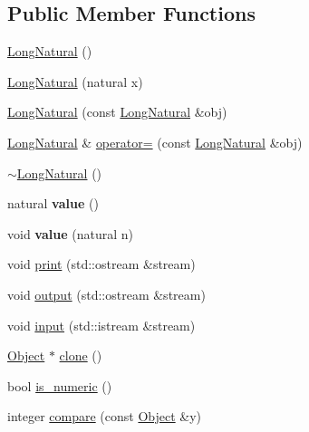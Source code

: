 \subsection*{Public Member Functions}
\begin{DoxyCompactItemize}
\item 
\hyperlink{classez_1_1objects_1_1LongNatural_a468b880a237b7dec2051986414e809b6}{Long\+Natural} ()
\item 
\hyperlink{classez_1_1objects_1_1LongNatural_a2eef9e11dbefe9e58d53190d9eb5af45}{Long\+Natural} (natural x)
\item 
\hyperlink{classez_1_1objects_1_1LongNatural_a5c00d4b026685010514b29a962736b23}{Long\+Natural} (const \hyperlink{classez_1_1objects_1_1LongNatural}{Long\+Natural} \&obj)
\item 
\hyperlink{classez_1_1objects_1_1LongNatural}{Long\+Natural} \& \hyperlink{classez_1_1objects_1_1LongNatural_a9622a9ce2b56127a5dfbd34ca00c44cf}{operator=} (const \hyperlink{classez_1_1objects_1_1LongNatural}{Long\+Natural} \&obj)
\item 
\hyperlink{classez_1_1objects_1_1LongNatural_a551123aa83bb4cee02aca5cc9137fe45}{$\sim$\+Long\+Natural} ()
\item 
\mbox{\label{classez_1_1objects_1_1LongNatural_a8a904d052ba54e9afebc087f31d2e23a}} 
natural {\bfseries value} ()
\item 
\mbox{\label{classez_1_1objects_1_1LongNatural_abb0641353058618d9098c5c6c95a5204}} 
void {\bfseries value} (natural n)
\item 
void \hyperlink{classez_1_1objects_1_1LongNatural_a38b758c27edf31447f3bc65228900266}{print} (std\+::ostream \&stream)
\item 
void \hyperlink{classez_1_1objects_1_1LongNatural_aae2570f931064a354df5553fd4425b90}{output} (std\+::ostream \&stream)
\item 
void \hyperlink{classez_1_1objects_1_1LongNatural_a37f51f88e9b039b5b59d0392ca03eeb0}{input} (std\+::istream \&stream)
\item 
\hyperlink{classez_1_1objects_1_1Object}{Object} $\ast$ \hyperlink{classez_1_1objects_1_1LongNatural_a328f33f3435bae79bbb3e9b0dcb8a3a7}{clone} ()
\item 
bool \hyperlink{classez_1_1objects_1_1LongNatural_a4cd663dc6f1eff09b83d19d76dd503cb}{is\+\_\+numeric} ()
\item 
integer \hyperlink{classez_1_1objects_1_1LongNatural_ad2ed144e5ee01a72eff476141c6e39ae}{compare} (const \hyperlink{classez_1_1objects_1_1Object}{Object} \&y)

\end{DoxyCompactItemize}
